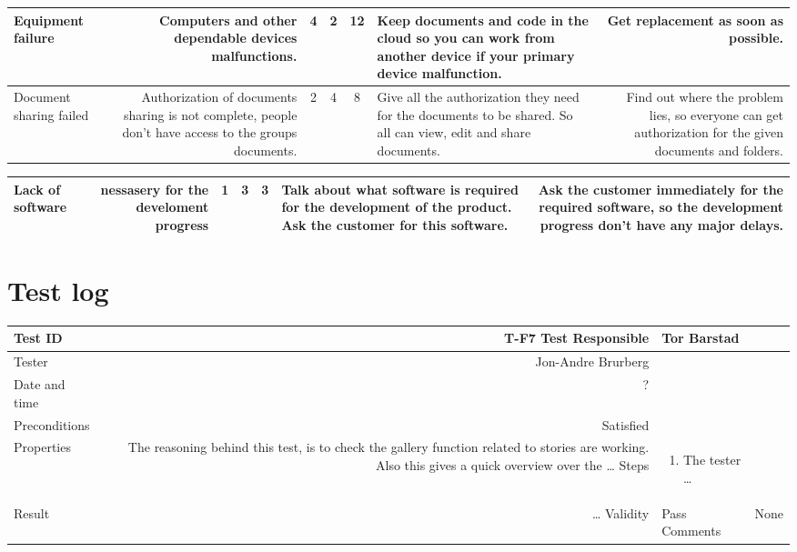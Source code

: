 \begin{center}
\begin{tabulary}{\textwidth}{L | R | C | C | C | L | R}
\hline
Equipment failure & Computers and other dependable devices malfunctions. & 4 & 2 & 12 & Keep documents and code in the cloud so you can work from another device if your primary device malfunction. & Get replacement as soon as possible.\\ 
\hline
Document sharing failed & Authorization of documents sharing is not complete, people don't have access to the groups documents. & 2 & 4 & 8 & Give all the authorization they need for the documents to be shared. So all can view, edit and share documents. & Find out where the problem lies, so everyone can get authorization for the given documents and folders.\\ 
\hline
						\end{tabulary}
						\begin{tabulary}{\textwidth}{L | R | C | C | C | L | R} \toprule
Lack of software  & nessasery for the develoment progress & 1 & 3 & 3 & Talk about what software is required for the development of the product. Ask the customer for this software.   & Ask the customer immediately for the required software, so the development progress don't have any major delays. \\ 
\hline

						\end{tabulary}
					\end{center}

\section{Test log}
						\begin{tabulary}{\textwidth}{L | R } \toprule
Test ID & T-F7 
Test Responsible & Tor Barstad	\\ \hline
Tester & Jon-Andre Brurberg	\\ \hline
Date and time & ?			\\ \hline
Preconditions& Satisfied			\\ \hline
Properties & The reasoning behind this test, is to check the gallery function related to stories are working. Also this gives a quick overview over the \dots
Steps & \begin{enumerate} \item The tester \dots  \end{enumerate} \\ \hline
Result & \dots
Validity & Pass
Comments& None
\hline
						\end{tabulary}